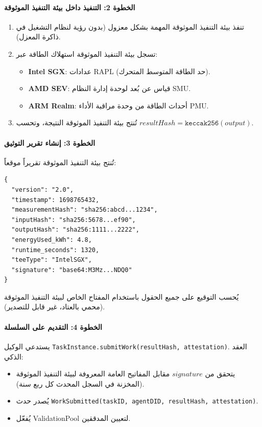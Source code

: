 \documentclass[11pt]{article}
\begin{document}
\paragraph{الخطوة 2: التنفيذ داخل بيئة التنفيذ الموثوقة}
\begin{enumerate}[noitemsep]
  \item تنفذ بيئة التنفيذ الموثوقة المهمة بشكل معزول (بدون رؤية لنظام التشغيل في ذاكرة المعزل).
  \item تسجل بيئة التنفيذ الموثوقة استهلاك الطاقة عبر:
    \begin{itemize}[noitemsep]
      \item \textbf{Intel SGX}: عدادات RAPL (حد الطاقة المتوسط المتحرك).
      \item \textbf{AMD SEV}: قياس عن بُعد لوحدة إدارة النظام SMU.
      \item \textbf{ARM Realm}: أحداث الطاقة من وحدة مراقبة الأداء PMU.
    \end{itemize}
  \item تُنتج بيئة التنفيذ الموثوقة النتيجة، وتحسب $resultHash = \texttt{keccak256}(output)$.
\end{enumerate}

\paragraph{الخطوة 3: إنشاء تقرير التوثيق}
تُنتج بيئة التنفيذ الموثوقة تقريراً موقعاً:
\begin{verbatim}
{
  "version": "2.0",
  "timestamp": 1698765432,
  "measurementHash": "sha256:abcd...1234",
  "inputHash": "sha256:5678...ef90",
  "outputHash": "sha256:1111...2222",
  "energyUsed_kWh": 4.8,
  "runtime_seconds": 1320,
  "teeType": "IntelSGX",
  "signature": "base64:M3Mz...NDQ0"
}
\end{verbatim}
يُحسب التوقيع على جميع الحقول باستخدام المفتاح الخاص لبيئة التنفيذ الموثوقة (محمي بالعتاد، غير قابل للتصدير).

\paragraph{الخطوة 4: التقديم على السلسلة}
يستدعي الوكيل \texttt{TaskInstance.submitWork(resultHash, attestation)}. العقد الذكي:
\begin{itemize}[noitemsep]
  \item يتحقق من $signature$ مقابل المفاتيح العامة المعروفة لبيئة التنفيذ الموثوقة (المخزنة في السجل المحدث كل ربع سنة).
  \item يُصدر حدث \texttt{WorkSubmitted(taskID, agentDID, resultHash, attestation)}.
  \item يُفعّل ValidationPool لتعيين المدققين.
\end{itemize}
\end{document}
